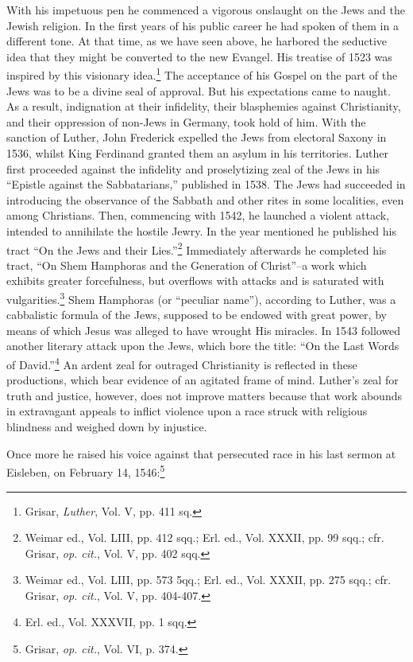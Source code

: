 With his impetuous pen he commenced a vigorous onslaught on
the Jews and the Jewish religion. In the first years of his public
career he had spoken of them in a different tone. At that time, as we
have seen above, he harbored the seductive idea that they might be
converted to the new Evangel. His treatise of 1523 was inspired by
this visionary idea.\footnote{Grisar, \textit{Luther}, Vol. V, pp. 411 sq.}
The acceptance of his Gospel on the part of the
Jews was to be a divine seal of approval. But his expectations came
to naught. As a result, indignation at their infidelity, their blasphemies
against Christianity, and their oppression of non-Jews in
Germany, took hold of him. With the sanction of Luther, John
Frederick expelled the Jews from electoral Saxony in 1536, whilst
King Ferdinand granted them an asylum in his territories.
Luther first proceeded against the infidelity and proselytizing zeal
of the Jews in his “Epistle against the Sabbatarians,” published in
1538. The Jews had succeeded in introducing the observance of the
Sabbath and other rites in some localities, even among Christians.
Then, commencing with 1542, he launched a violent attack, intended
to annihilate the hostile Jewry. In the year mentioned he published
his tract “On the Jews and their Lies.”\footnote
{Weimar ed., Vol. LIII, pp. 412 sqq.; Erl. ed., Vol. XXXII, pp. 99 sqq.; cfr. Grisar, \textit{op.
cit.}, Vol. V, pp. 402 sqq.}
Immediately afterwards he
completed his tract, “On Shem Hamphoras and the Generation of
Christ”--a work which exhibits greater forcefulness, but overflows
with attacks and is saturated with vulgarities.\footnote
{Weimar ed., Vol. LIII, pp. 573 5qq.; Erl. ed., Vol. XXXII, pp. 275 sqq.; cfr. Grisar,
\textit{op. cit.}, Vol. V, pp. 404-407.}
Shem Hamphoras (or
“peculiar name”), according to Luther, was a cabbalistic formula of the
Jews, supposed to be endowed with great power, by means of which Jesus
was alleged to have wrought His miracles. In 1543 followed
another literary attack upon the Jews, which bore the title: “On the
Last Words of David.”\footnote{Erl. ed., Vol. XXXVII, pp. 1 sqq.}
An ardent zeal for outraged Christianity is reflected
in these productions, which bear evidence of an agitated frame of
mind. Luther’s zeal for truth and justice, however, does not improve
matters because that work abounds in extravagant appeals to inflict
violence upon a race struck with religious blindness and weighed
down by injustice.

Once more he raised his voice against that persecuted race in his last
sermon at Eisleben, on February 14, 1546:\footnote{Grisar, \textit{op. cit.}, Vol. VI, p. 374.}

